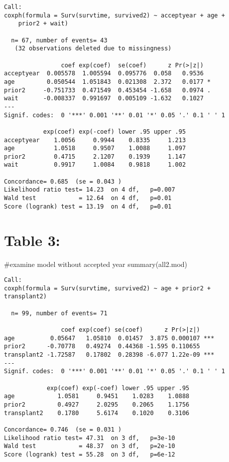 \documentclass[
  letterpaper,
  DIV=11,
  numbers=noendperiod]{scrreprt}
\newenvironment{Shaded}{\begin{snugshade}}{\end{snugshade}}
\newcommand{\CommentTok}[1]{\textcolor[rgb]{0.37,0.37,0.37}{#1}}
\newcommand{\FunctionTok}[1]{\textcolor[rgb]{0.28,0.35,0.67}{#1}}
\newcommand{\NormalTok}[1]{\textcolor[rgb]{0.00,0.23,0.31}{#1}}
\begin{document}
\begin{verbatim}
Call:
coxph(formula = Surv(survtime, survived2) ~ acceptyear + age + 
    prior2 + wait)

  n= 67, number of events= 43 
   (32 observations deleted due to missingness)

                coef exp(coef)  se(coef)      z Pr(>|z|)  
acceptyear  0.005578  1.005594  0.095776  0.058   0.9536  
age         0.050544  1.051843  0.021308  2.372   0.0177 *
prior2     -0.751733  0.471549  0.453454 -1.658   0.0974 .
wait       -0.008337  0.991697  0.005109 -1.632   0.1027  
---
Signif. codes:  0 '***' 0.001 '**' 0.01 '*' 0.05 '.' 0.1 ' ' 1

           exp(coef) exp(-coef) lower .95 upper .95
acceptyear    1.0056     0.9944    0.8335     1.213
age           1.0518     0.9507    1.0088     1.097
prior2        0.4715     2.1207    0.1939     1.147
wait          0.9917     1.0084    0.9818     1.002

Concordance= 0.685  (se = 0.043 )
Likelihood ratio test= 14.23  on 4 df,   p=0.007
Wald test            = 12.64  on 4 df,   p=0.01
Score (logrank) test = 13.19  on 4 df,   p=0.01
\end{verbatim}

\hypertarget{table-3}{%
\section{Table 3:}\label{table-3}}

\begin{Shaded}
\begin{Highlighting}[]
\CommentTok{\#examine model without accepted year }
\FunctionTok{summary}\NormalTok{(all2.mod)}
\end{Highlighting}
\end{Shaded}

\begin{verbatim}
Call:
coxph(formula = Surv(survtime, survived2) ~ age + prior2 + transplant2)

  n= 99, number of events= 71 

                coef exp(coef) se(coef)      z Pr(>|z|)    
age          0.05647   1.05810  0.01457  3.875 0.000107 ***
prior2      -0.70778   0.49274  0.44368 -1.595 0.110655    
transplant2 -1.72587   0.17802  0.28398 -6.077 1.22e-09 ***
---
Signif. codes:  0 '***' 0.001 '**' 0.01 '*' 0.05 '.' 0.1 ' ' 1

            exp(coef) exp(-coef) lower .95 upper .95
age            1.0581     0.9451    1.0283    1.0888
prior2         0.4927     2.0295    0.2065    1.1756
transplant2    0.1780     5.6174    0.1020    0.3106

Concordance= 0.746  (se = 0.031 )
Likelihood ratio test= 47.31  on 3 df,   p=3e-10
Wald test            = 48.37  on 3 df,   p=2e-10
Score (logrank) test = 55.28  on 3 df,   p=6e-12
\end{verbatim}
\end{document}
